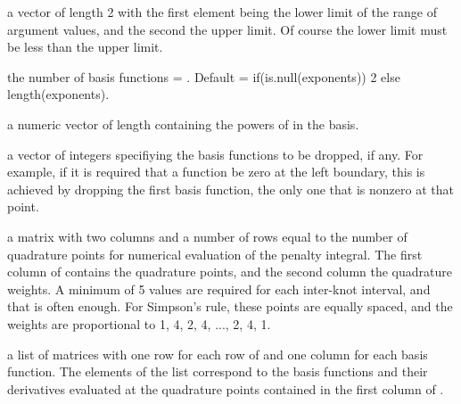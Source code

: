 \documentclass{article}
\begin{document}
\begin{Arguments}
\begin{ldescription}
\item[\code{rangeval}] a vector of length 2 with the first element being the lower limit of
the range of argument values, and the second the upper limit.  Of
course the lower limit must be less than the upper limit.

\item[\code{nbasis}] the number of basis functions = .  Default =
if(is.null(exponents)) 2 else length(exponents).

\item[\code{exponents}] a numeric vector of length  containing the powers of
 in the basis.

\item[\code{dropind}] a vector of integers specifiying the basis functions to be dropped,
if any.  For example, if it is required that a function be zero at
the left boundary, this is achieved by dropping the first basis
function, the only one that is nonzero at that point.

\item[\code{quadvals}] a matrix with two columns and a number of rows equal to the number
of quadrature points for numerical evaluation of the penalty
integral.  The first column of  contains the
quadrature points, and the second column the quadrature weights.  A
minimum of 5 values are required for each inter-knot interval, and
that is often enough.  For Simpson's rule, these points are equally
spaced, and the weights are proportional to 1, 4, 2, 4, ..., 2, 4,
1.

\item[\code{values}] a list of matrices with one row for each row of  and
one column for each basis function.  The elements of the list
correspond to the basis functions and their derivatives evaluated at
the quadrature points contained in the first column of
.


\end{ldescription}
\end{Arguments}
\end{document}
